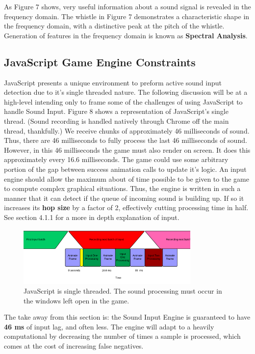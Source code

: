 \documentclass[DIV=calc, paper=a4, fontsize=11pt, twocolumn]{scrartcl}   %
\begin{document}
  \par As Figure 7 shows, very useful information about a sound signal is revealed in the frequency domain. The whistle in Figure 7 demonstrates a characteristic shape in the frequency domain, with a distinctive peak at the pitch of the whistle. Generation of features in the frequency domain is known as \textbf{Spectral Analysis}.

\subsection{JavaScript Game Engine Constraints}
JavaScript presents a unique environment to preform active sound input detection due to it's single threaded nature. The following discussion will be at a high-level intending only to frame some of the challenges of using JavaScript to handle Sound Input. Figure 8 shows a representation of JavaScript's single thread. (Sound recording is handled natively through Chrome off the main thread, thankfully.) We receive chunks of approximately 46 milliseconds of sound. Thus, there are 46 milliseconds to fully process the last 46 milliseconds of sound. However, in this 46 milliseconds the game must also render on screen. It does this approximately every 16.6 milliseconds. The game could use some arbitrary portion of the gap between success animation calls to update it's logic. An input engine should allow the maximum about of time possible to be given to the game to compute complex graphical situations. Thus, the engine is written in such a manner that it can detect if the queue of incoming sound is building up. If so it increases its \textbf{hop size} by a factor of 2, effectively cutting processing time in half. See section 4.1.1 for a more in depth explanation of input.
\begin{figure}[h]
\centering
\includegraphics[width=90mm]{figures/JavascriptEventLoop.png}
\caption{JavaScript is single threaded. The sound processing must occur in the windows left open in the game.}
\label{overflow}
\end{figure}

\par The take away from this section is: the Sound Input Engine is guaranteed to  have \textbf{46 ms} of input lag, and often less. The engine will adapt to a heavily computational by decreasing the number of times a sample is processed, which comes at the cost of increasing false negatives.
\end{document}
